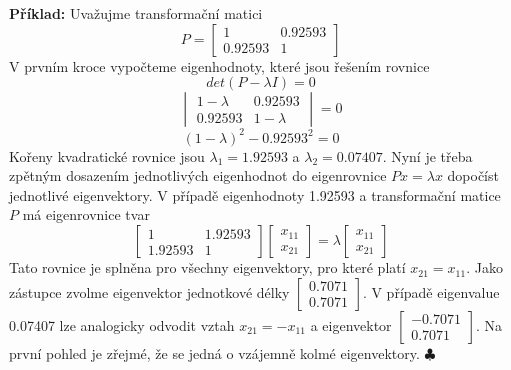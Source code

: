 \documentclass[a4paper]{book}
\begin{document}
\noindent \textbf{Příklad:} Uvažujme transformační matici
\begin{equation*}
     P =
     \begin{bmatrix}
          1 & 0.92593 \\
          0.92593 & 1
     \end{bmatrix}
\end{equation*}
V prvním kroce vypočteme eigenhodnoty, které jsou řešením rovnice
\begin{equation*}
det(P - \lambda I) = 0
\end{equation*}
\begin{equation*}
     \begin{vmatrix}
          1 - \lambda & 0.92593 \\
          0.92593 & 1 - \lambda
     \end{vmatrix}
     = 0
\end{equation*}
\begin{equation*}
(1 - \lambda)^2 - 0.92593^2 = 0
\end{equation*}
Kořeny kvadratické rovnice jsou $\lambda_1 = 1.92593$ a $\lambda_2 = 0.07407$. Nyní je třeba zpětným dosazením jednotlivých eigenhodnot do eigenrovnice $Px = \lambda x$ dopočíst jednotlivé eigenvektory. V případě eigenhodnoty 1.92593 a transformační matice $P$ má eigenrovnice tvar
\begin{equation*}
     \begin{bmatrix}
          1 & 1.92593 \\
          1.92593 & 1
     \end{bmatrix}
	\begin{bmatrix}
		x_{11} \\
		x_{21}
     \end{bmatrix}
     =
     \lambda
	\begin{bmatrix}
		x_{11} \\
		x_{21}
     \end{bmatrix}     
\end{equation*}
Tato rovnice je splněna pro všechny eigenvektory, pro které platí $x_{21} = x_{11}$. Jako zástupce zvolme eigenvektor jednotkové délky $\begin{bmatrix} 0.7071\\ 0.7071 \end{bmatrix}$. V případě eigenvalue 0.07407 lze analogicky odvodit vztah $x_{21} = -x_{11}$ a eigenvektor $\begin{bmatrix} -0.7071\\ 0.7071 \end{bmatrix}$. Na první pohled je zřejmé, že se jedná o vzájemně kolmé eigenvektory. $\clubsuit$
\end{document}
